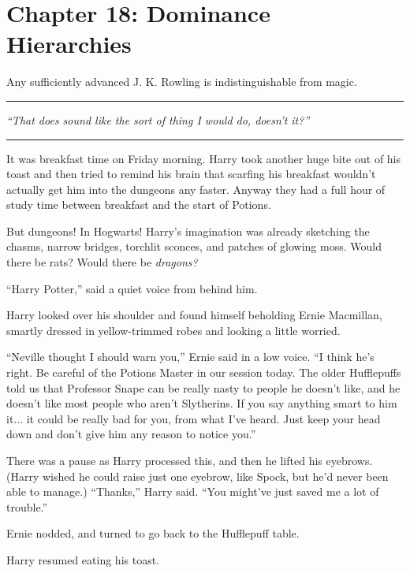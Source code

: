 \chapter{Chapter 18: Dominance Hierarchies}
Any sufficiently advanced J. K. Rowling is indistinguishable from magic.

\begin{center}\rule{3in}{0.4pt}\end{center}

\emph{``That does sound like the sort of thing I would do, doesn't
it?''}

\begin{center}\rule{3in}{0.4pt}\end{center}

It was breakfast time on Friday morning. Harry took another huge bite
out of his toast and then tried to remind his brain that scarfing his
breakfast wouldn't actually get him into the dungeons any faster. Anyway
they had a full hour of study time between breakfast and the start of
Potions.

But dungeons! In Hogwarts! Harry's imagination was already sketching the
chasms, narrow bridges, torchlit sconces, and patches of glowing moss.
Would there be rats? Would there be \emph{dragons?}

``Harry Potter,'' said a quiet voice from behind him.

Harry looked over his shoulder and found himself beholding Ernie
Macmillan, smartly dressed in yellow-trimmed robes and looking a little
worried.

``Neville thought I should warn you,'' Ernie said in a low voice. ``I
think he's right. Be careful of the Potions Master in our session today.
The older Hufflepuffs told us that Professor Snape can be really nasty
to people he doesn't like, and he doesn't like most people who aren't
Slytherins. If you say anything smart to him it... it could be
really bad for you, from what I've heard. Just keep your head down and
don't give him any reason to notice you.''

There was a pause as Harry processed this, and then he lifted his
eyebrows. (Harry wished he could raise just one eyebrow, like Spock, but
he'd never been able to manage.) ``Thanks,'' Harry said. ``You might've
just saved me a lot of trouble.''

Ernie nodded, and turned to go back to the Hufflepuff table.

Harry resumed eating his toast.

